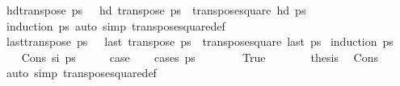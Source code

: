\begin{isabellebody}
%
\isadelimproof
\isanewline
%
\endisadelimproof
\isanewline
{}\isamarkupfalse%
\ hd{\isacharunderscore}{\kern0pt}transpose{\isacharcolon}{\kern0pt}\ {\isachardoublequoteopen}ps\ {\isasymnoteq}{\isacharbrackleft}{\kern0pt}{\isacharbrackright}{\kern0pt}\ {\isasymLongrightarrow}\ hd\ {\isacharparenleft}{\kern0pt}transpose\ ps{\isacharparenright}{\kern0pt}\ {\isacharequal}{\kern0pt}\ transpose{\isacharunderscore}{\kern0pt}square\ {\isacharparenleft}{\kern0pt}hd\ ps{\isacharparenright}{\kern0pt}{\isachardoublequoteclose}\isanewline
%
\isadelimproof
\ \ %
\endisadelimproof
%
\isatagproof
{}\isamarkupfalse%
\ {\isacharparenleft}{\kern0pt}induction\ ps{\isacharparenright}{\kern0pt}\ {\isacharparenleft}{\kern0pt}auto\ simp{\isacharcolon}{\kern0pt}\ transpose{\isacharunderscore}{\kern0pt}square{\isacharunderscore}{\kern0pt}def{\isacharparenright}{\kern0pt}%
\endisatagproof
{\isafoldproof}%
%
\isadelimproof
\isanewline
%
\endisadelimproof
\isanewline
{}\isamarkupfalse%
\ last{\isacharunderscore}{\kern0pt}transpose{\isacharcolon}{\kern0pt}\ {\isachardoublequoteopen}ps\ {\isasymnoteq}{\isacharbrackleft}{\kern0pt}{\isacharbrackright}{\kern0pt}\ {\isasymLongrightarrow}\ last\ {\isacharparenleft}{\kern0pt}transpose\ ps{\isacharparenright}{\kern0pt}\ {\isacharequal}{\kern0pt}\ transpose{\isacharunderscore}{\kern0pt}square\ {\isacharparenleft}{\kern0pt}last\ ps{\isacharparenright}{\kern0pt}{\isachardoublequoteclose}\isanewline
%
\isadelimproof
%
\endisadelimproof
%
\isatagproof
{}\isamarkupfalse%
\ {\isacharparenleft}{\kern0pt}induction\ ps{\isacharparenright}{\kern0pt}\isanewline
\ \ \isamarkupfalse%
\ {\isacharparenleft}{\kern0pt}Cons\ s\isactrlsub i\ ps{\isacharparenright}{\kern0pt}\isanewline
\ \ \isamarkupfalse%
\ \isamarkupfalse%
\ {\isacharquery}{\kern0pt}case\isanewline
\ \ \isamarkupfalse%
\ {\isacharparenleft}{\kern0pt}cases\ {\isachardoublequoteopen}ps\ {\isacharequal}{\kern0pt}\ {\isacharbrackleft}{\kern0pt}{\isacharbrackright}{\kern0pt}{\isachardoublequoteclose}{\isacharparenright}{\kern0pt}\isanewline
\ \ \ \ \isamarkupfalse%
\ True\isanewline
\ \ \ \ \isamarkupfalse%
\ \isamarkupfalse%
\ {\isacharquery}{\kern0pt}thesis\ \isamarkupfalse%
\ Cons\ \isamarkupfalse%
\ {\isacharparenleft}{\kern0pt}auto\ simp{\isacharcolon}{\kern0pt}\ transpose{\isacharunderscore}{\kern0pt}square{\isacharunderscore}{\kern0pt}def{\isacharparenright}{\kern0pt}\ \ \ \ \ \ \isanewline

\end{isabellebody}
